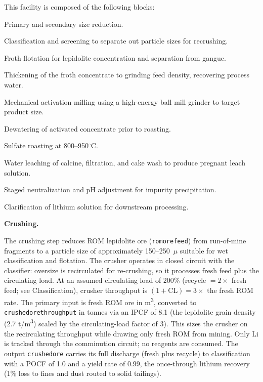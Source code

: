 \documentclass{article}
\renewcommand\_{\textunderscore\allowbreak}
\begin{document}
This facility is composed of the following blocks:

\begin{description}[noitemsep, topsep=0pt]
    \item[\textbullet\enskip\texttt{Crushing:}] Primary and secondary size reduction.
    \item[\textbullet\enskip\texttt{Classification:}] Classification and screening to separate out particle sizes for recrushing. 
    \item[\textbullet\enskip\texttt{Flotation:}] Froth flotation for lepidolite concentration and separation from gangue.
    \item[\textbullet\enskip\texttt{Thickening:}] Thickening of the froth concentrate to grinding feed density, recovering process water.
    \item[\textbullet\enskip\texttt{Grinding:}] Mechanical activation milling using a high-energy ball mill grinder to target product size.
    \item[\textbullet\enskip\texttt{Dewatering:}] Dewatering of activated concentrate prior to roasting.
    \item[\textbullet\enskip\texttt{Sulfate Roasting:}] Sulfate roasting at 800--950$^\circ$C.
    \item[\textbullet\enskip\texttt{Water Leaching:}] Water leaching of calcine, filtration, and cake wash to produce pregnant leach solution.
    \item[\textbullet\enskip\texttt{Impurity Removal and Neutralization:}] Staged neutralization and pH adjustment for impurity 
    precipitation.
    \item[\textbullet\enskip\texttt{Clarification:}] Clarification of lithium solution for 
    downstream processing.
\end{description}

\medskip
\noindent\textbf{Crushing.}\quad

The crushing step reduces ROM lepidolite ore (\texttt{rom\_ore\_feed}) from run-of-mine fragments to a particle size of approximately 150--250~$\mu$ suitable for wet classification and flotation. The crusher operates in closed circuit with the classifier: oversize is recirculated for re-crushing, so it processes fresh feed plus the circulating load. At an assumed circulating load of 200\% (recycle $= 2\times$ fresh feed; see Classification), crusher throughput is $(1+\mathrm{CL}) = 3\times$ the fresh ROM rate. The primary input is fresh ROM ore in \si{m^3}, converted to \texttt{crushed\_ore\_throughput} in tonnes via an IPCF of 8.1 (the lepidolite grain density (2.7 \si{t/m^3}) scaled by the circulating-load factor of 3). This sizes the crusher on the recirculating throughput while drawing only fresh ROM from mining. Only Li is tracked through the comminution circuit; no reagents are consumed. The output \texttt{crushed\_ore} carries its full discharge (fresh plus recycle) to classification with a POCF of 1.0 and a yield rate of 0.99, the once-through lithium recovery (1\% loss to fines and dust routed to solid tailings).
\end{document}
